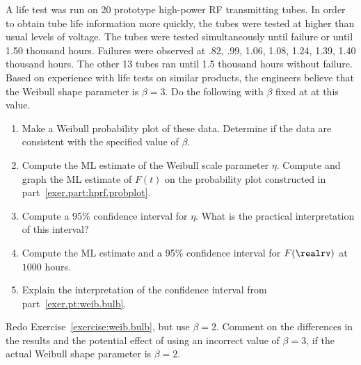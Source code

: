 \begin{exercise}
\label{exercise:weib.bulb}
A life test was run on 20 prototype high-power RF transmitting tubes.
In order to obtain tube life information more quickly, the tubes were
tested at higher than usual levels of voltage.  The tubes were tested
simultaneously until failure or until 1.50 thousand hours. Failures
were observed at .82, .99, 1.06, 1.08, 1.24, 1.39, 1.40 thousand
hours.  The other 13 tubes ran until 1.5 thousand hours without
failure.  Based on experience with life tests on similar products, the
engineers believe that the Weibull shape parameter is $\beta=3$. Do
the following with $\beta$ fixed at at this value.
\begin{enumerate}
\item
\label{exer.part:hprf.probplot}
Make a Weibull probability plot of these data. Determine if the
data are consistent with the specified value of $\beta$.
\item
Compute the ML estimate of the Weibull scale parameter $\eta$.
Compute and graph the ML estimate of $F(t)$ on the probability plot
constructed in part~\ref{exer.part:hprf.probplot}.
\item
Compute a 95\% confidence interval for $\eta$.
What is the practical interpretation of this interval?
\item
\label{exer.pt:weib.bulb}
Compute the ML estimate and a 95\% confidence interval for
$F(\realrv)$ at $1000$ hours.
\item
Explain the interpretation of the confidence interval from
part~\ref{exer.pt:weib.bulb}.
\end{enumerate}
\end{exercise}

\begin{exercise}
Redo Exercise~\ref{exercise:weib.bulb}, but use 
$\beta=2$. Comment on the differences in the results and the potential
effect of using an incorrect value of $\beta=3$,
if the actual Weibull shape parameter is $\beta=2$.
\end{exercise}

